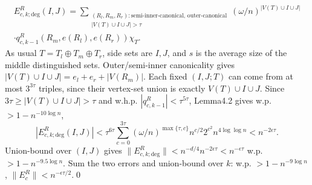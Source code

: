 \begin{multline*}E_{c,k;\mathrm{deg}}^R(I,J)=\sum_{\substack{(R_l,R_m,R_r):\text{semi-inner-canonical, outer-canonical}\\|V(T)\cup I\cup J|>\tau}}(\omega/n)^{|V(T)\cup I\cup J|}\\\cdot q_{c,k-1}^R(R_m,e(R_l),e(R_r))\chi_T.\end{multline*}
As usual $T=T_l\oplus T_m\oplus T_r$, side sets are $I,J$, and $s$ is the average size of the middle distinguished sets. Outer/semi-inner canonicality gives $|V(T)\cup I\cup J|=e_l+e_r+|V(R_m)|$. Each fixed $(I,J;T)$ can come from at most $3^{3\tau}$ triples, since their vertex-set union is exactly $V(T)\cup I\cup J$. Since $3\tau\ge|V(T)\cup I\cup J|>\tau$ and w.h.p. $|q_{c,k-1}^R|<\tau^{5\tau}$, Lemma4.2 gives w.p. $>1-n^{-10\log n}$,
\[|E_{c,k;\mathrm{deg}}^R(I,J)|<\tau^{6\tau}\sum_{c=0}^{3\tau}(\omega/n)^{\max\{\tau,c\}}n^{c/2}2^{c^2}n^{4\log\log n}<n^{-2\epsilon\tau}.\]
Union-bound over $(I,J)$ gives $\|E_{c,k;\mathrm{deg}}^R\|<n^{-d/4}n^{-2\epsilon\tau}<n^{-\epsilon\tau}$ w.p. $>1-n^{-9.5\log n}$. Sum the two errors and union-bound over $k$: w.p. $>1-n^{-9\log n}$, $\|E_c^R\|<n^{-\epsilon\tau/2}$.\qed
